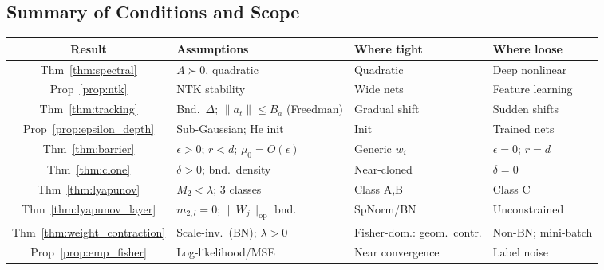 \documentclass{article}
\providecommand{\norm}[1]{\lVert #1 \rVert}
\theoremstyle{plain}
\theoremstyle{definition}
\theoremstyle{remark}
\begin{document}
\subsection{Summary of Conditions and Scope}

\begin{center}
\footnotesize
\setlength{\tabcolsep}{2pt}
\begin{tabular}{@{}cp{2.6cm}p{2.1cm}p{2cm}@{}}
\toprule
\textbf{Result} & \textbf{Assumptions} & \textbf{Where tight} & \textbf{Where loose} \\
\midrule
Thm~\ref{thm:spectral} & $A\succ 0$, quadratic & Quadratic & Deep nonlinear \\
\addlinespace
Prop~\ref{prop:ntk} & NTK stability & Wide nets & Feature learning \\
\addlinespace
Thm~\ref{thm:tracking} & Bnd.\ $\Delta$; $\norm{a_t}\!\leq\!B_a$ (Freedman) & Gradual shift & Sudden shifts \\
\addlinespace
Prop~\ref{prop:epsilon_depth} & Sub-Gaussian; He init & Init & Trained nets \\
\addlinespace
Thm~\ref{thm:barrier} & $\epsilon\!>\!0$; $r\!<\!d$; $\mu_0\!=\!O(\epsilon)$ & Generic $w_i$ & $\epsilon\!=\!0$; $r\!=\!d$ \\
\addlinespace
Thm~\ref{thm:clone} & $\delta\!>\!0$; bnd.\ density & Near-cloned & $\delta\!=\!0$ \\
\addlinespace
Thm~\ref{thm:lyapunov} & $M_2\!<\!\lambda$; 3 classes & Class A,B & Class C \\
\addlinespace
Thm~\ref{thm:lyapunov_layer} & $m_{2,l}\!=\!0$; $\norm{W_j}_{\mathrm{op}}$ bnd. & SpNorm/BN & Unconstrained \\
\addlinespace
Thm~\ref{thm:weight_contraction} & Scale-inv.\ (BN); $\lambda\!>\!0$ & Fisher-dom.: geom.\ contr. & Non-BN; mini-batch \\
\addlinespace
Prop~\ref{prop:emp_fisher} & Log-likelihood/MSE & Near convergence & Label noise \\
\bottomrule
\end{tabular}
\end{center}
\end{document}
